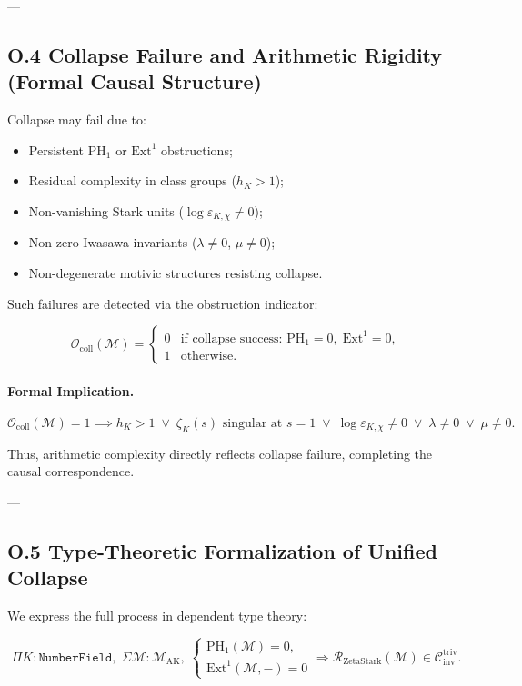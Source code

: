 \documentclass[11pt]{article}
\begin{document}
---

\subsection*{O.4 Collapse Failure and Arithmetic Rigidity (Formal Causal Structure)}

Collapse may fail due to:

\begin{itemize}
  \item Persistent \( \mathrm{PH}_1 \) or \( \mathrm{Ext}^1 \) obstructions;
  \item Residual complexity in class groups (\( h_K > 1 \));
  \item Non-vanishing Stark units (\( \log \varepsilon_{K,\chi} \neq 0 \));
  \item Non-zero Iwasawa invariants (\( \lambda \neq 0 \), \( \mu \neq 0 \));
  \item Non-degenerate motivic structures resisting collapse.
\end{itemize}

Such failures are detected via the obstruction indicator:

\[
\mathcal{O}_{\mathrm{coll}}(\mathcal{M}) =
\begin{cases}
0 & \text{if collapse success: } \mathrm{PH}_1 = 0,\; \mathrm{Ext}^1 = 0, \\
1 & \text{otherwise}.
\end{cases}
\]

\paragraph{Formal Implication.}
\[
\mathcal{O}_{\mathrm{coll}}(\mathcal{M}) = 1 \implies
h_K > 1 \;\lor\; \zeta_K(s) \text{ singular at } s = 1 \;\lor\; \log \varepsilon_{K,\chi} \neq 0 \;\lor\; \lambda \neq 0 \;\lor\; \mu \neq 0.
\]

Thus, arithmetic complexity directly reflects collapse failure, completing the causal correspondence.

---

\subsection*{O.5 Type-Theoretic Formalization of Unified Collapse}

We express the full process in dependent type theory:

\[
\Pi K : \texttt{NumberField}, \;
\Sigma \mathcal{M} : \mathcal{M}_{\mathrm{AK}}, \;
\begin{cases}
\mathrm{PH}_1(\mathcal{M}) = 0, \\
\mathrm{Ext}^1(\mathcal{M}, -) = 0
\end{cases}
\Rightarrow
\mathcal{R}_{\mathrm{ZetaStark}}(\mathcal{M}) \in \mathcal{C}_{\mathrm{inv}}^{\mathrm{triv}}.
\]
\end{document}
